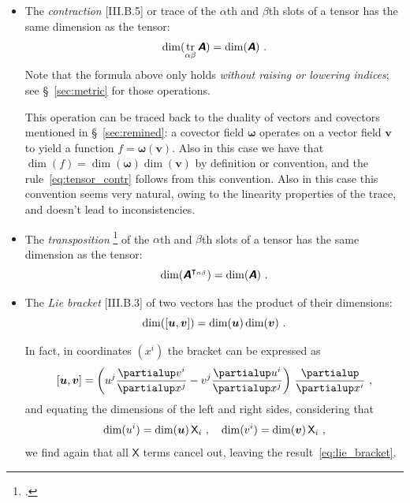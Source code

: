\documentclass[\ifafour a4paper,12pt,\else a5paper,10pt,\fi%
onecolumn,oneside,article,%
british%
]{memoir}
\theoremstyle{remark}
\theoremstyle{innote}
\newcommand*{\mathte}[1]{\textbf{\textit{\textsf{#1}}}}
\newcommand*{\citep}{\footcites}
\newcommand*{\de}{\partialup}%
\DeclareMathOperator{\tr}{tr}%
\DeclarePairedDelimiter\clcl{[}{]}
\renewcommand*{\|}[1][]{\nonscript\,#1\vert\nonscript\;\mathopen{}}
\newcommand*{\sect}{\S}%
\newcommand*{\Xx}{\textsf{X}}
\newcommand*{\yA}{\mathte{A}}
\newcommand*{\yom}{\bm{\omega}}
\newcommand*{\yv}{\bm{v}}
\newcommand*{\yu}{\bm{u}}
\renewcommand*{\i}{\indices}
\newcommand*{\dex}[1][i]{\frac{\de}{\de x^{#1}}}
\begin{document}
\begin{itemize}[wide=0pt]
\item The \emph{contraction} [III.B.5] or trace of the $\alpha$th and $\beta$th
  slots of a tensor has the same dimension as the tensor:
  \begin{equation}
    \dim(\tr_{\alpha\beta}\yA) = \dim(\yA)\ .
    \label{eq:tensor_contr}
  \end{equation}
  Note that the formula above only holds \emph{without raising or lowering
    indices}; see \sect~\ref{sec:metric} for those operations.

  This operation can be traced back to the duality of vectors and covectors
  mentioned in \sect~\ref{sec:remined}: a covector field $\yom$ operates on
  a vector field $\yv$ to yield a function $f=\yom(\yv)$. Also in this case
  we have that $\dim(f)=\dim(\yom)\dim(\yv)$ by definition or convention,
  and the rule~\eqref{eq:tensor_contr} follows from this convention. Also
  in this case this convention seems very natural, owing to the linearity
  properties of the trace, and doesn't lead to inconsistencies.

  

\item The \emph{transposition} \citep[called \enquote{building an isomer}
  by][\sect~I.3 p.~13]{schouten1924_r1954}[\sect~II.4
  p.~20]{schouten1951_r1989} of the $\alpha$th and $\beta$th slots of a
  tensor has the same dimension as the tensor:
  \begin{equation}
    \dim(\yA^{\intercal_{\alpha\beta}}) = \dim(\yA)\ .
    \label{eq:tensor_transp}
  \end{equation}


\item The \emph{Lie bracket} [III.B.3] of two vectors has the product of their dimensions:
  \begin{equation}
    \dim(\clcl{\yu,\yv}) =\dim(\yu)\dim(\yv)\ .
    \label{eq:lie_bracket}
\end{equation}

In fact, in coordinates $(x^{i})$ the bracket can be expressed as
\begin{equation}
  \label{eq:bracket_coords}
  \clcl{\yu,\yv} =
  \biggl( u\i{^{j}}\frac{\de v\i{^{i}}}{\de x\i{^{j}}}
  - v\i{^{j}}\frac{\de u\i{^{i}}}{\de x\i{^{j}}} \biggr)\ \dex\ ,
\end{equation}
and equating the dimensions of the left and right sides, considering that
\begin{equation}
  \label{eq:dim_u_and_v}
  \dim(u\i{^{i}}) = \dim(\yu)\,\Xx_{i}\ ,\quad
  \dim(v\i{^{i}}) = \dim(\yv)\,\Xx_{i}\ ,
\end{equation}
we find again that all $\Xx$ terms cancel out, leaving the
result~\eqref{eq:lie_bracket}.


\end{itemize}
\end{document}

